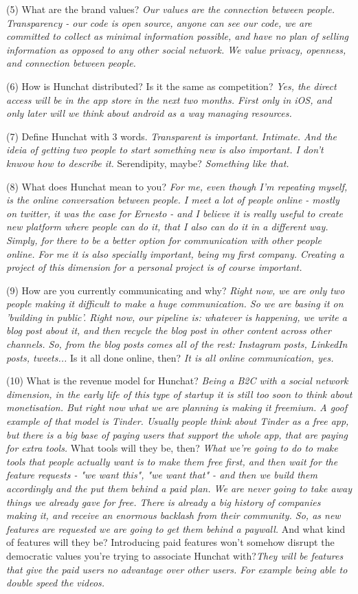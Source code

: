\documentclass[12pt]{article}
\begin{document}
(5) What are the brand values? \textit{Our values are the connection between people. Transparency - our code is open source, anyone can see our code, we are committed to collect as minimal information possible, and have no plan of selling information as opposed to any other social network. We value privacy, openness, and connection between people.}

(6) How is Hunchat distributed? Is it the same as competition? \textit{Yes, the direct access will be in the app store in the next two months. First only in iOS, and only later will we think about android as a way managing resources.}

(7) Define Hunchat with 3 words. \textit{Transparent is important. Intimate. And the ideia of getting two people to start something new is also important. I don't knwow how to describe it.} Serendipity, maybe? \textit{Something like that.}

(8) What does Hunchat mean to you? \textit{For me, even though I'm repeating myself, is the online conversation between people. I meet a lot of people online - mostly on twitter, it was the case for Ernesto - and I believe it is really useful to create new platform where people can do it, that I also can do it in a different way. Simply, for there to be a better option for communication with other people online. For me it is also specially important, being my first company. Creating a project of this dimension for a personal project is of course important.}

(9) How are you currently communicating and why? \textit{Right now, we are only two people making it difficult to make a huge communication. So we are basing it on 'building in public'. Right now, our pipeline is: whatever is happening, we write a blog post about it, and then recycle the blog post in other content across other channels. So, from the blog posts comes all of the rest: Instagram posts, LinkedIn posts, tweets...} Is it all done online, then? \textit{It is all online communication, yes.}

(10) What is the revenue model for Hunchat? \textit{Being a B2C with a social network dimension, in the early life of this type of startup it is still too soon to think about monetisation. But right now what we are planning is making it freemium. A goof example of that model is Tinder. Usually people think about Tinder as a free app, but there is a big base of paying users that support the whole app, that are paying for extra tools. } What tools will they be, then? \textit{What we're going to do to make tools that people actually want is to make them free first, and then wait for the feature requests - "we want this", "we want that" -  and then we build them accordingly and the put them behind a paid plan. We are never going to take away things we already gave for free. There is already a big history of companies making it, and receive an enormous backlash from their community. So, as new features are requested we are going to get them behind a paywall.} And what kind of features will they be? Introducing paid features won't somehow disrupt  the democratic values you're trying to associate Hunchat with?\textit{They will be features that give the paid users no advantage over other users. For example being able to double speed the videos.}
\end{document}
